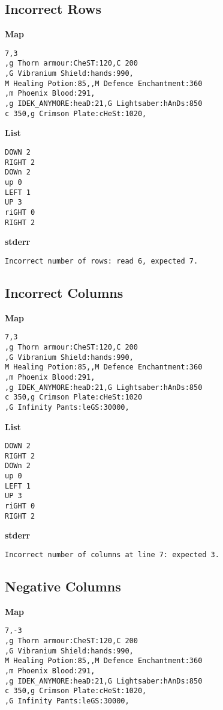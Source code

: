\documentclass{article}
\begin{document}
\subsection{Incorrect Rows}

\quad \textbf{Map}
\begin{lstlisting}
7,3
,g Thorn armour:CheST:120,C 200
,G Vibranium Shield:hands:990,
M Healing Potion:85,,M Defence Enchantment:360
,m Phoenix Blood:291,
,g IDEK_ANYMORE:heaD:21,G Lightsaber:hAnDs:850
c 350,g Crimson Plate:cHeSt:1020,
\end{lstlisting}

\textbf{List}
\begin{lstlisting}
DOWN 2
RIGHT 2
DOWn 2
up 0
LEFT 1
UP 3
riGHT 0
RIGHT 2
\end{lstlisting}
\pagebreak

\textbf{stderr}
\begin{lstlisting}
Incorrect number of rows: read 6, expected 7.
\end{lstlisting}

\subsection{Incorrect Columns}

\quad \textbf{Map}
\begin{lstlisting}
7,3
,g Thorn armour:CheST:120,C 200
,G Vibranium Shield:hands:990,
M Healing Potion:85,,M Defence Enchantment:360
,m Phoenix Blood:291,
,g IDEK_ANYMORE:heaD:21,G Lightsaber:hAnDs:850
c 350,g Crimson Plate:cHeSt:1020
,G Infinity Pants:leGS:30000,
\end{lstlisting}

\textbf{List}
\begin{lstlisting}
DOWN 2
RIGHT 2
DOWn 2
up 0
LEFT 1
UP 3
riGHT 0
RIGHT 2
\end{lstlisting}
\pagebreak

\textbf{stderr}
\begin{lstlisting}
Incorrect number of columns at line 7: expected 3.
\end{lstlisting}

\subsection{Negative Columns}

\quad \textbf{Map}
\begin{lstlisting}
7,-3
,g Thorn armour:CheST:120,C 200
,G Vibranium Shield:hands:990,
M Healing Potion:85,,M Defence Enchantment:360
,m Phoenix Blood:291,
,g IDEK_ANYMORE:heaD:21,G Lightsaber:hAnDs:850
c 350,g Crimson Plate:cHeSt:1020,
,G Infinity Pants:leGS:30000,
\end{lstlisting}
\end{document}
